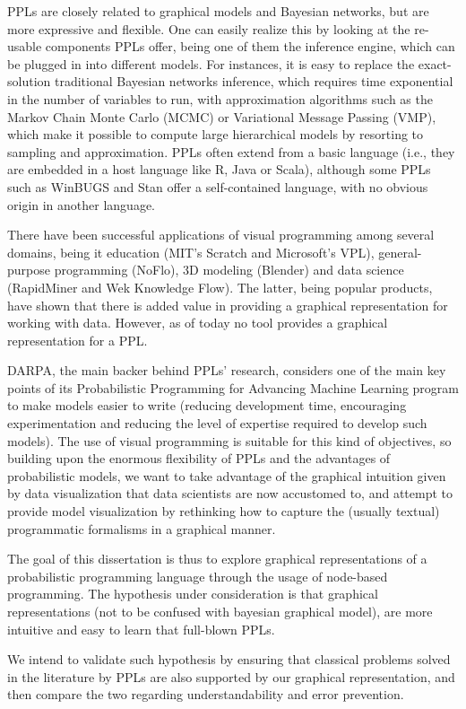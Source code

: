 PPLs are closely related to graphical models and Bayesian networks, but are
more expressive and flexible. One can easily realize this by looking at the
re-usable components PPLs offer, being one of them the inference engine, which
can be plugged in into different models. For instances, it is easy to replace
the exact-solution traditional Bayesian networks inference, which requires time
exponential in the number of variables to run, with approximation algorithms
such as the Markov Chain Monte Carlo (MCMC) or Variational Message Passing
(VMP), which make it possible to compute large hierarchical models by resorting
to sampling and approximation. PPLs often extend from a basic language (i.e.,
they are embedded in a host language like R, Java or Scala), although some PPLs
such as WinBUGS and Stan offer a self-contained language, with no obvious origin
in another language.

There have been successful applications of visual programming among several
domains, being it education (MIT’s Scratch and Microsoft’s VPL), general-purpose
programming (NoFlo), 3D modeling (Blender) and data science (RapidMiner and Wek
 Knowledge Flow). The latter, being popular products, have shown that there is
 added value in providing a graphical representation for working with data.
 However, as of today no tool provides a graphical representation for a PPL.

DARPA, the main backer behind PPLs’ research, considers one of the main key
points of its Probabilistic Programming for Advancing Machine Learning program
to make models easier to write (reducing development time, encouraging
experimentation and reducing the level of expertise required to develop such
models). The use of visual programming is suitable for this kind of objectives,
so building upon the enormous flexibility of PPLs and the advantages of
probabilistic models, we want to take advantage of the graphical intuition given
by data visualization that data scientists are now accustomed to, and attempt
to provide model visualization by rethinking how to capture
the (usually textual) programmatic formalisms in a graphical manner.

The goal of this dissertation is thus to explore graphical representations of a
probabilistic programming language through the usage of node-based programming.
The hypothesis under consideration is that graphical representations (not to be
confused with bayesian graphical model), are more intuitive and easy to learn
that full-blown PPLs.

We intend to validate such hypothesis by ensuring that classical problems solved
in the literature by PPLs are also supported by our graphical representation,
and then compare the two regarding understandability and error prevention.
